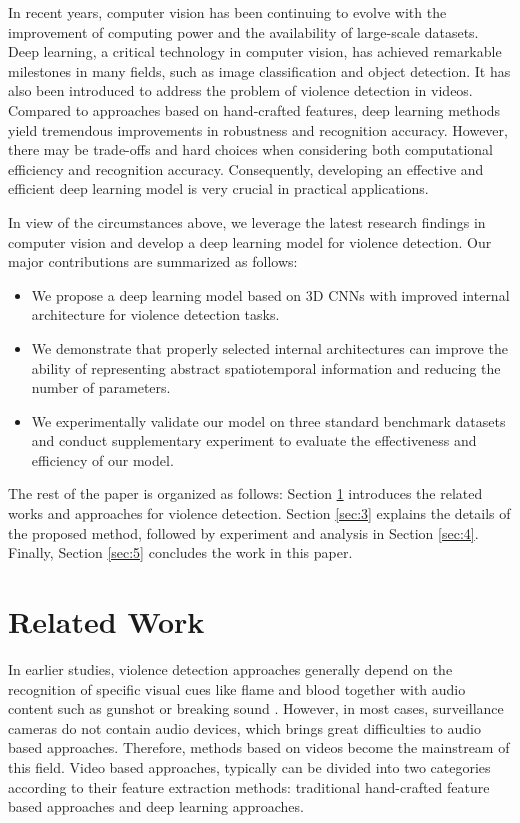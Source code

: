 \documentclass[10pt,twocolumn,letterpaper]{article}
\begin{document}
In recent years, computer vision has been continuing to evolve with the improvement of computing power and the availability of large-scale datasets.
Deep learning, a critical technology in computer vision, has achieved remarkable milestones in many fields, such as image classification and object detection.
It has also been introduced to address the problem of violence detection in videos.
Compared to approaches based on hand-crafted features, deep learning methods yield tremendous improvements in robustness and recognition accuracy.
However, there may be trade-offs and hard choices when considering both computational efficiency and recognition accuracy.
Consequently, developing an effective and efficient deep learning model is very crucial in practical applications.

In view of the circumstances above, we leverage the latest research findings in computer vision and develop a deep learning model for violence detection. Our major contributions are summarized as follows:
\begin{itemize}
	\item We propose a deep learning model based on 3D CNNs with improved internal architecture for violence detection tasks.
	\item We demonstrate that properly selected internal architectures can improve the ability of representing abstract spatiotemporal information and reducing the number of parameters.
	\item We experimentally validate our model on three standard benchmark datasets and conduct supplementary experiment to evaluate the effectiveness and efficiency of our model.
\end{itemize}

The rest of the paper is organized as follows: Section \ref{sec:2} introduces the related works and approaches for violence detection. Section \ref{sec:3} explains the details of the proposed method, followed by experiment and analysis in Section \ref{sec:4}. Finally, Section \ref{sec:5} concludes the work in this paper.


\section{Related Work}
\label{sec:2}

In earlier studies, violence detection approaches generally depend on the recognition of specific visual cues like flame and blood together with audio content such as gunshot or breaking sound \cite{nam1998audio, cheng2003semantic, zajdel2007cassandra}.
However, in most cases, surveillance cameras do not contain audio devices, which brings great difficulties to audio based approaches. 
Therefore, methods based on videos become the mainstream of this field. 
Video based approaches, typically can be divided into two categories according to their feature extraction methods: 
traditional hand-crafted feature based approaches and deep learning approaches.
\end{document}
